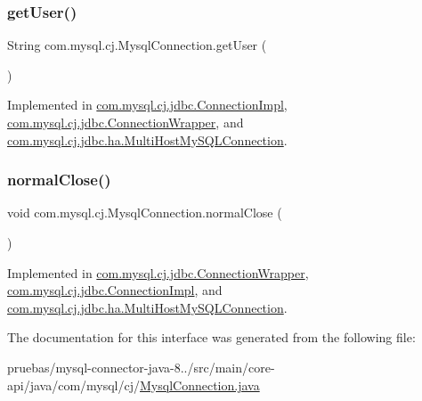 \mbox{\label{interfacecom_1_1mysql_1_1cj_1_1_mysql_connection_adc3ee83d060d0d48cb92e181dc5cbbb6}} 
\subsubsection{\texorpdfstring{get\+User()}{getUser()}}
{\footnotesize\ttfamily String com.\+mysql.\+cj.\+Mysql\+Connection.\+get\+User (\begin{DoxyParamCaption}{ }\end{DoxyParamCaption})}



Implemented in \mbox{\hyperlink{classcom_1_1mysql_1_1cj_1_1jdbc_1_1_connection_impl_afbb744e880f00dfaf434498ab5cbceba}{com.\+mysql.\+cj.\+jdbc.\+Connection\+Impl}}, \mbox{\hyperlink{classcom_1_1mysql_1_1cj_1_1jdbc_1_1_connection_wrapper_ae9d26519d0e8ec724fb48ebc905f7684}{com.\+mysql.\+cj.\+jdbc.\+Connection\+Wrapper}}, and \mbox{\hyperlink{classcom_1_1mysql_1_1cj_1_1jdbc_1_1ha_1_1_multi_host_my_s_q_l_connection_a3e6181cd20398fc2968c8ea0204f7c95}{com.\+mysql.\+cj.\+jdbc.\+ha.\+Multi\+Host\+My\+S\+Q\+L\+Connection}}.

\mbox{\label{interfacecom_1_1mysql_1_1cj_1_1_mysql_connection_a15e693e5e3b333c7a29b238b510734ab}} 
\subsubsection{\texorpdfstring{normal\+Close()}{normalClose()}}
{\footnotesize\ttfamily void com.\+mysql.\+cj.\+Mysql\+Connection.\+normal\+Close (\begin{DoxyParamCaption}{ }\end{DoxyParamCaption})}



Implemented in \mbox{\hyperlink{classcom_1_1mysql_1_1cj_1_1jdbc_1_1_connection_wrapper_a7fdf5a3f3e8efeaefc0a51ed69309416}{com.\+mysql.\+cj.\+jdbc.\+Connection\+Wrapper}}, \mbox{\hyperlink{classcom_1_1mysql_1_1cj_1_1jdbc_1_1_connection_impl_a4bfd91b48bd990b05482d972c940a53f}{com.\+mysql.\+cj.\+jdbc.\+Connection\+Impl}}, and \mbox{\hyperlink{classcom_1_1mysql_1_1cj_1_1jdbc_1_1ha_1_1_multi_host_my_s_q_l_connection_a926772cecea56ad4444ebd84d576bdc4}{com.\+mysql.\+cj.\+jdbc.\+ha.\+Multi\+Host\+My\+S\+Q\+L\+Connection}}.



The documentation for this interface was generated from the following file\+:\begin{DoxyCompactItemize}
\item 
pruebas/mysql-\/connector-\/java-\/8../src/main/core-\/api/java/com/mysql/cj/\mbox{\hyperlink{_mysql_connection_8java}{Mysql\+Connection.\+java}}\end{DoxyCompactItemize}
